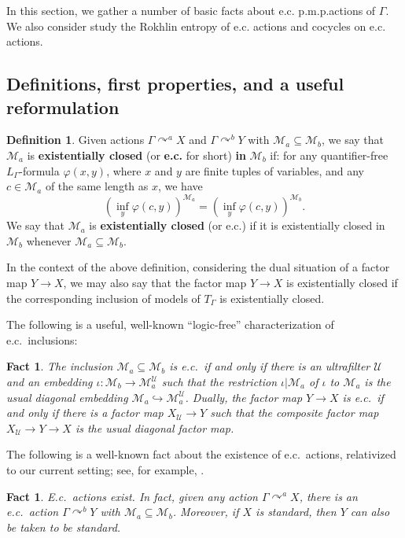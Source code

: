 \documentclass[12pt]{amsart}
\newtheorem{fact}[thm]{Fact}
\theoremstyle{definition}
\newtheorem{defn}[thm]{Definition}
\def\cal{\mathcal}
\def\u{\mathsf 1}
\def \u{\mathcal U}
\newcommand{\pmp}{p{$.$}m{$.$}p{$.$}}
\newcommand{\acts}{\curvearrowright}
\begin{document}
In this section, we gather a number of basic facts about e.c. \pmp actions of $\Gamma$.  We also consider study the Rokhlin entropy of e.c. actions and cocycles on e.c. actions.

\subsection{Definitions, first properties, and a useful reformulation}

\begin{defn}
Given actions $\Gamma \acts^a X$ and $\Gamma\acts^b Y$ with $\cal M_a\subseteq \cal M_b$, we say that $\cal M_a$ is \textbf{existentially closed} (or \textbf{e.c.} for short) \textbf{in} $\cal M_b$ if:  for any quantifier-free $L_\Gamma$-formula $\varphi(x,y)$, where $x$ and $y$ are finite tuples of variables, and any $c\in \cal M_a$ of the same length as $x$, we have $$\left(\inf_y \varphi(c,y)\right)^{\cal M_a}=\left(\inf_y \varphi(c,y)\right)^{\cal M_b}.$$  We say that $\cal M_a$ is \textbf{existentially closed} (or e.c.) if it is existentially closed in $\cal M_b$ whenever $\cal M_a\subseteq \cal M_b$.
\end{defn}

In the context of the above definition, considering the dual situation of a factor map $Y\to X$, we may also say that the factor map $Y\to X$ is existentially closed if the corresponding inclusion of models of $T_\Gamma$ is existentially closed.

The following is a useful, well-known  ``logic-free'' characterization of e.c.\ inclusions:

\begin{fact}\label{soft}
The inclusion $\cal M_a\subseteq \cal M_b$ is e.c.\ if and only if there is an ultrafilter $\u$ and an embedding $\iota:\cal M_b\to \cal M_a^\u$ such that the restriction $\iota|\cal M_a$ of $\iota$ to $\cal M_a$ is the usual diagonal embedding $\cal M_a\hookrightarrow\cal M_a^\u$.  Dually, the factor map $Y\to X$ is e.c.\ if and only if there is a factor map $X_\u\to Y$ such that the composite factor map $X_\u\to Y\to X$ is the usual diagonal factor map.
\end{fact}

The following is a well-known fact about the existence of e.c.\ actions, relativized to our current setting; see, for example, \cite[Fact 2.8]{usvy}.

\begin{fact}
E.c.\ actions exist.  In fact, given any action $\Gamma\acts^a X$, there is an e.c.\ action $\Gamma\acts^b Y$ with $\cal M_a\subseteq \cal M_b$.  Moreover, if $X$ is standard, then $Y$ can also be taken to be standard.
\end{fact}
\end{document}
